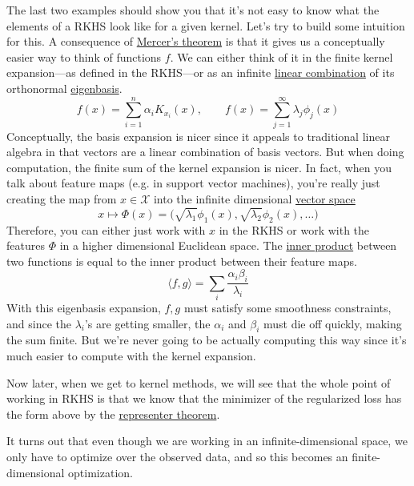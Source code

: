   The last two examples should show you that it's not easy to know what the elements of a RKHS look like for a given kernel. Let's try to build some intuition for this. A consequence of \hyperref[thm:mercers-theorem]{Mercer's theorem} is that it gives us a conceptually easier way to think of functions $f$. We can either think of it in the finite kernel expansion---as defined in the RKHS---or as an infinite \hyperref[lin-def:linear-combination]{linear combination} of its orthonormal \hyperref[lin-def:eigenbasis]{eigenbasis}. 
  \begin{equation}
    f(x) = \sum_{i=1}^n \alpha_i K_{x_i} (x), \qquad f(x) = \sum_{j=1}^\infty \lambda_j \phi_j(x)
  \end{equation}
  Conceptually, the basis expansion is nicer since it appeals to traditional linear algebra in that vectors are a linear combination of basis vectors. But when doing computation, the finite sum of the kernel expansion is nicer. In fact, when you talk about feature maps (e.g. in support vector machines), you're really just creating the map from $x \in \mathcal{X}$ into the infinite dimensional \hyperref[lin-def:vector-space]{vector space} 
  \begin{equation}
    x \mapsto \Phi(x) = \big( \sqrt{\lambda_1} \phi_1(x), \sqrt{\lambda_2} \phi_2(x), \ldots \big)
  \end{equation}
  Therefore, you can either just work with $x$ in the RKHS or work with the features $\Phi$ in a higher dimensional Euclidean space. The \hyperref[lin-def:inner-product]{inner product} between two functions is equal to the inner product between their feature maps. 
  \begin{equation}
    \langle f, g \rangle = \sum_i \frac{\alpha_i \beta_i}{\lambda_i} 
  \end{equation}
  With this eigenbasis expansion, $f, g$ must satisfy some smoothness constraints, and since the $\lambda_i$'s are getting smaller, the $\alpha_i$ and $\beta_i$ must die off quickly, making the sum finite. But we're never going to be actually computing this way since it's much easier to compute with the kernel expansion. 

  \begin{theorem}
    \label{thm:representer-theorem}
    
  \end{theorem}

  Now later, when we get to kernel methods, we will see that the whole point of working in RKHS is that we know that the minimizer of the regularized loss has the form above by the \hyperref[thm:representer-theorem]{representer theorem}. 

  It turns out that even though we are working in an infinite-dimensional space, we only have to optimize over the observed data, and so this becomes an finite-dimensional optimization. 

